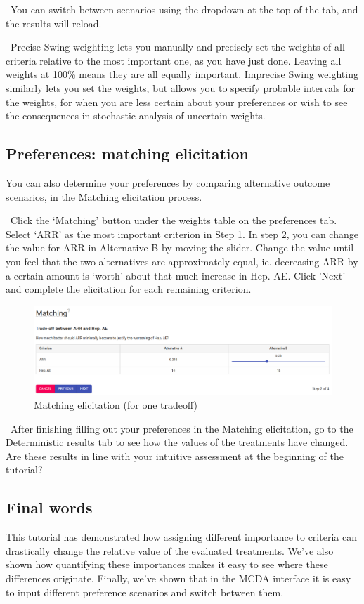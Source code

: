 \documentclass[00_mcda_tutorial.tex]{subfiles}
\begin{document}
\noindent \faLightbulbO \, You can switch between scenarios using the dropdown at the top of the tab, and the results will reload.
\newline

\noindent \faGraduationCap \, Precise Swing weighting lets you manually and precisely set the weights of all criteria relative to the most important one, as you have just done. Leaving all weights at 100\% means they are all equally important. Imprecise Swing weighting similarly lets you set the weights, but allows you to specify probable intervals for the weights, for when you are less certain about your preferences or wish to see the consequences in stochastic analysis of uncertain weights.

\subsection*{Preferences: matching elicitation}
You can also determine your preferences by comparing alternative outcome scenarios, in the Matching elicitation process.
\newline

\noindent \leftpointright \, Click the ‘Matching’ button under the weights table on the preferences tab. Select ‘ARR’ as the most important criterion in Step 1. In step 2, you can change the value for ARR in Alternative B by moving the slider. Change the value until you feel that the two alternatives are approximately equal, ie. decreasing ARR by a certain amount is ‘worth’ about that much increase in Hep. AE. Click 'Next' and complete the elicitation for each remaining criterion.
\newline

\begin{figure}[!h]
    \centering
	\includegraphics[width=\textwidth]{fig/matching1.png}
    \caption{Matching elicitation (for one tradeoff)}
	\label{fig:matching1}
\end{figure}

\noindent \leftpointright \, After finishing filling out your preferences in the Matching elicitation, go to the Deterministic results tab to see how the values of the treatments have changed. Are these results in line with your intuitive assessment at the beginning of the tutorial?

\subsection*{Final words}
This tutorial has demonstrated how assigning different importance to criteria can drastically change the relative value of the evaluated treatments. We’ve also shown how quantifying these importances makes it easy to see where these differences originate. Finally, we’ve shown that in the MCDA interface it is easy to input different preference scenarios and switch between them.
\end{document}
